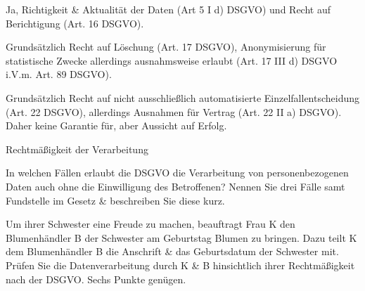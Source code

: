\documentclass{exercisesheet}
\begin{document}
\begin{solutions}
  \item Ja, Richtigkeit \& Aktualität der Daten (Art 5 I d) DSGVO) und Recht auf Berichtigung (Art. 16 DSGVO).
  \item Grundsätzlich Recht auf Löschung (Art. 17 DSGVO), Anonymisierung für statistische Zwecke allerdings ausnahmsweise erlaubt (Art. 17 III d) DSGVO i.V.m. Art. 89 DSGVO).
  \item Grundsätzlich Recht auf nicht ausschließlich automatisierte Einzelfallentscheidung (Art. 22 DSGVO), allerdings Ausnahmen für Vertrag (Art. 22 II a) DSGVO). Daher keine Garantie für, aber Aussicht auf Erfolg.
\end{solutions}

\begin{exercises}{Rechtmäßigkeit der Verarbeitung}
\item In welchen Fällen erlaubt die DSGVO die Verarbeitung von personenbezogenen Daten auch ohne die Einwilligung des Betroffenen? Nennen Sie drei Fälle samt Fundstelle im Gesetz \& beschreiben Sie diese kurz.
\item Um ihrer Schwester eine Freude zu machen, beauftragt Frau K den Blumenhändler B der Schwester am Geburtstag Blumen zu bringen. Dazu teilt K dem Blumenhändler B die Anschrift \& das Geburtsdatum der Schwester mit. Prüfen Sie die Datenverarbeitung durch K \& B hinsichtlich ihrer Rechtmäßigkeit nach der DSGVO. Sechs Punkte genügen.
\end{exercises}
\end{document}
